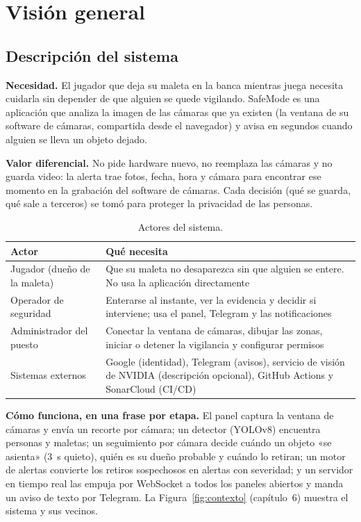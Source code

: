 \chapter{Visión general}

\section{Descripción del sistema}
\textbf{Necesidad.} El jugador que deja su maleta en la banca mientras juega necesita cuidarla sin depender de que alguien se quede
vigilando. SafeMode es una aplicación que analiza la imagen de las cámaras que ya existen (la ventana de su software de cámaras, compartida
desde el navegador) y avisa en segundos cuando alguien se lleva un objeto dejado.

\textbf{Valor diferencial.} No pide hardware nuevo, no reemplaza las cámaras y no guarda video: la alerta trae fotos, fecha, hora y cámara
para encontrar ese momento en la grabación del software de cámaras. Cada decisión (qué se guarda, qué sale a terceros) se tomó para proteger
la privacidad de las personas.

\begin{table}[H]
\centering\small
\caption{Actores del sistema.}\label{tab:actores}
\begin{tabularx}{\textwidth}{lY}
\toprule
\textbf{Actor} & \textbf{Qué necesita} \\
\midrule
Jugador (dueño de la maleta) & Que su maleta no desaparezca sin que alguien se entere. No usa la aplicación directamente \\
Operador de seguridad & Enterarse al instante, ver la evidencia y decidir si interviene; usa el panel, Telegram y las notificaciones \\
Administrador del puesto & Conectar la ventana de cámaras, dibujar las zonas, iniciar o detener la vigilancia y configurar permisos \\
Sistemas externos & Google (identidad), Telegram (avisos), servicio de visión de NVIDIA (descripción opcional), GitHub Actions y SonarCloud (CI/CD) \\
\bottomrule
\end{tabularx}
\end{table}

\textbf{Cómo funciona, en una frase por etapa.} El panel captura la ventana de cámaras y envía un recorte por cámara; un detector (YOLOv8)
encuentra personas y maletas; un seguimiento por cámara decide cuándo un objeto «se asienta» (3~s quieto), quién es su dueño probable y
cuándo lo retiran; un motor de alertas convierte los retiros sospechosos en alertas con severidad; y un servidor en tiempo real las empuja
por WebSocket a todos los paneles abiertos y manda un aviso de texto por Telegram. La Figura~\ref{fig:contexto} (capítulo~6) muestra el sistema
y sus vecinos.

